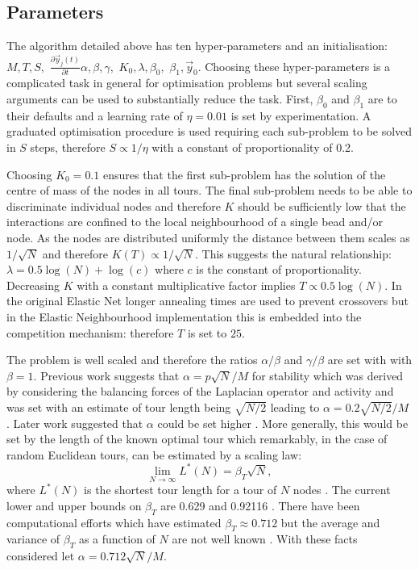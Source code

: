 \subsection{Parameters}
The algorithm detailed above has ten hyper-parameters and an initialisation: $M, T, S,$ $\frac{ \partial \vec{y}_j(t)}{\partial t}\alpha, \beta, \gamma,$ $K_0, \lambda, \beta_0,$ $ \beta_1, \vec{y}_0$. Choosing these hyper-parameters is a complicated task in general for optimisation problems but several scaling arguments can be used to substantially reduce the task. First, $\beta_0$ and $\beta_1$ are to their defaults and a learning rate of $\eta = 0.01$ is set by experimentation. A graduated optimisation procedure is used requiring each sub-problem to be solved in $S$ steps, therefore $S \propto 1/\eta$ with a constant of proportionality of 0.2. 

Choosing $K_0 = 0.1$ ensures that the first sub-problem has the solution of the centre of mass of the nodes in all tours. The final sub-problem needs to be able to discriminate individual nodes and therefore $K$ should be sufficiently low that the interactions are confined to the local neighbourhood of a single bead and/or node. As the nodes are distributed uniformly the distance between them scales as $1/\sqrt{N}$ and therefore $K(T) \propto 1/\sqrt{N}$. This suggests the natural relationship: $\lambda = 0.5 \log(N) + \log(c)$ where $c$ is the constant of proportionality. Decreasing $K$ with a constant multiplicative factor implies $T \propto 0.5 \log(N)$. In the original Elastic Net longer annealing times are used to prevent crossovers but in the Elastic Neighbourhood implementation this is embedded into the competition mechanism: therefore $T$ is set to $25$. 

The problem is well scaled and therefore the ratios $\alpha/\beta$ and $\gamma/\beta$ are set with with $\beta = 1$. Previous work suggests that $\alpha = p \sqrt{N}/M $ for stability which was derived by considering the balancing forces of the Laplacian operator and activity and was set with an estimate of tour length being $\sqrt{N/2} $ leading to  $\alpha = 0.2 \sqrt{N/2} / M$ \cite{Durbin1989-gs}. Later work suggested that $\alpha$ could be set higher \cite{Simmen1991-hm}. More generally, this would be set by the length of the known optimal tour which remarkably, in the case of random Euclidean tours, can be estimated by a scaling law:
\begin{equation}
\lim_{N\rightarrow \infty} L^*(N) = \beta_T \sqrt{N},
\end{equation}
where $L^*(N)$ is the shortest tour length for a tour of $N$ nodes \cite{Beardwood1959-wb}. The current lower and upper bounds on $\beta_T$ are 0.629 and 0.92116 \cite{Steinerberger2015-ur}. There have been computational efforts which have estimated $\beta_T \approx 0.712$ but the average and variance of $\beta_T$ as a function of $N$ are not well known \cite{Johnson1996-yb, Percus1996-bp}. With these facts considered let $\alpha = 0.712 \sqrt{N}/M$. 


